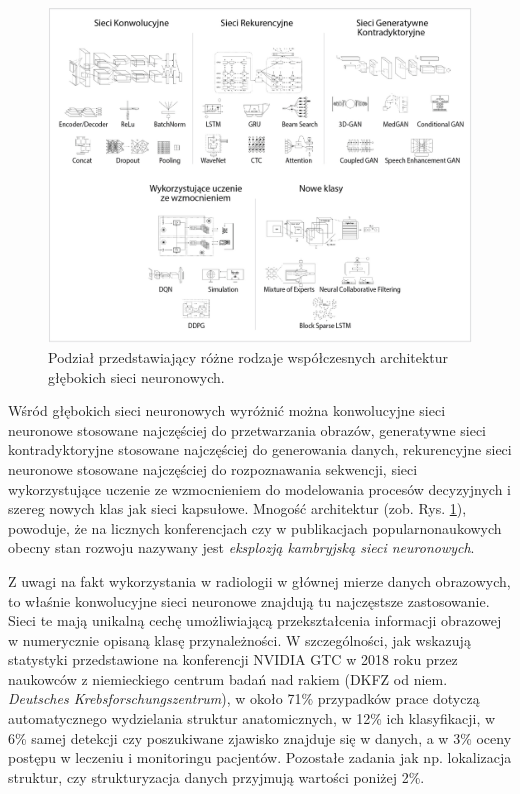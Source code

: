 \begin{figure}[h]
	\centering
	\includegraphics[width=1\textwidth]{figures/rodzajeSieciNeuronowych.png}
	\caption{Podział przedstawiający różne rodzaje współczesnych architektur głębokich sieci neuronowych.}
	\label{DLcambrianExplosion}
\end{figure}

Wśród głębokich sieci neuronowych wyróżnić można konwolucyjne sieci neuronowe stosowane najczęściej do przetwarzania obrazów, generatywne sieci kontradyktoryjne stosowane najczęściej do generowania danych, rekurencyjne sieci neuronowe stosowane najczęściej do rozpoznawania sekwencji, sieci wykorzystujące uczenie ze wzmocnieniem do modelowania procesów decyzyjnych i szereg nowych klas jak sieci kapsułowe. Mnogość architektur (zob. Rys. \ref{DLcambrianExplosion}), powoduje, że na licznych konferencjach czy w publikacjach popularnonaukowych obecny stan rozwoju nazywany jest \textit{eksplozją kambryjską sieci neuronowych}. 


Z uwagi na fakt wykorzystania w radiologii w głównej mierze danych obrazowych, to właśnie konwolucyjne sieci neuronowe znajdują tu najczęstsze zastosowanie. Sieci te mają unikalną cechę umożliwiającą przekształcenia informacji obrazowej w numerycznie opisaną klasę przynależności. W szczególności, jak wskazują statystyki przedstawione na konferencji NVIDIA GTC w 2018 roku przez naukowców z niemieckiego centrum badań nad rakiem (DKFZ od niem. \textit{Deutsches Krebsforschungszentrum}), w około 71\% przypadków prace dotyczą automatycznego wydzielania struktur anatomicznych, w 12\% ich klasyfikacji, w 6\% samej detekcji czy poszukiwane zjawisko znajduje się w danych, a w 3\% oceny postępu w leczeniu i monitoringu pacjentów. Pozostałe zadania jak np. lokalizacja struktur, czy strukturyzacja danych przyjmują wartości poniżej 2\%.

